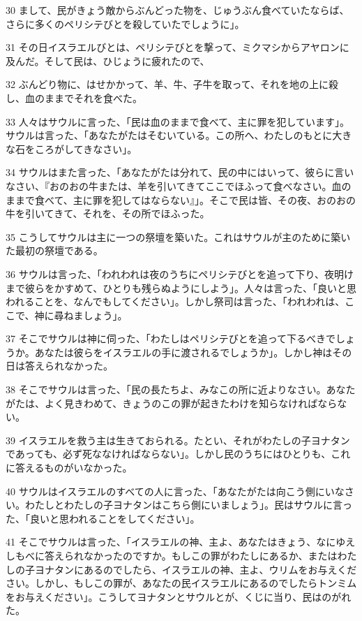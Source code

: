 \par 30 まして、民がきょう敵からぶんどった物を、じゅうぶん食べていたならば、さらに多くのペリシテびとを殺していたでしょうに」。
\par 31 その日イスラエルびとは、ペリシテびとを撃って、ミクマシからアヤロンに及んだ。そして民は、ひじょうに疲れたので、
\par 32 ぶんどり物に、はせかかって、羊、牛、子牛を取って、それを地の上に殺し、血のままでそれを食べた。
\par 33 人々はサウルに言った、「民は血のままで食べて、主に罪を犯しています」。サウルは言った、「あなたがたはそむいている。この所へ、わたしのもとに大きな石をころがしてきなさい」。
\par 34 サウルはまた言った、「あなたがたは分れて、民の中にはいって、彼らに言いなさい、『おのおの牛または、羊を引いてきてここでほふって食べなさい。血のままで食べて、主に罪を犯してはならない』」。そこで民は皆、その夜、おのおの牛を引いてきて、それを、その所でほふった。
\par 35 こうしてサウルは主に一つの祭壇を築いた。これはサウルが主のために築いた最初の祭壇である。
\par 36 サウルは言った、「われわれは夜のうちにペリシテびとを追って下り、夜明けまで彼らをかすめて、ひとりも残らぬようにしよう」。人々は言った、「良いと思われることを、なんでもしてください」。しかし祭司は言った、「われわれは、ここで、神に尋ねましょう」。
\par 37 そこでサウルは神に伺った、「わたしはペリシテびとを追って下るべきでしょうか。あなたは彼らをイスラエルの手に渡されるでしょうか」。しかし神はその日は答えられなかった。
\par 38 そこでサウルは言った、「民の長たちよ、みなこの所に近よりなさい。あなたがたは、よく見きわめて、きょうのこの罪が起きたわけを知らなければならない。
\par 39 イスラエルを救う主は生きておられる。たとい、それがわたしの子ヨナタンであっても、必ず死ななければならない」。しかし民のうちにはひとりも、これに答えるものがいなかった。
\par 40 サウルはイスラエルのすべての人に言った、「あなたがたは向こう側にいなさい。わたしとわたしの子ヨナタンはこちら側にいましょう」。民はサウルに言った、「良いと思われることをしてください」。
\par 41 そこでサウルは言った、「イスラエルの神、主よ、あなたはきょう、なにゆえしもべに答えられなかったのですか。もしこの罪がわたしにあるか、またはわたしの子ヨナタンにあるのでしたら、イスラエルの神、主よ、ウリムをお与えください。しかし、もしこの罪が、あなたの民イスラエルにあるのでしたらトンミムをお与えください」。こうしてヨナタンとサウルとが、くじに当り、民はのがれた。
